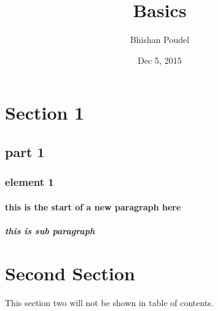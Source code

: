 \documentclass{article}
\title{Basics}
\author{Bhishan Poudel}
\date{Dec 5, 2015}
\begin{document}
\maketitle
\tableofcontents{}

\section{Section 1}
	\subsection{part 1}
		\subsubsection{element 1}
		\paragraph{this is the start of a new paragraph here}
			\subparagraph{this is sub paragraph}
			
\section*{Second Section}
	This section two will not be shown in table of contents.
\end{document}
